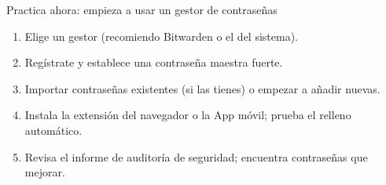 \begin{tcbpractice}{Practica ahora: empieza a usar un gestor de contraseñas}
\begin{enumerate}
  \item Elige un gestor (recomiendo Bitwarden o el del sistema).
  \item Regístrate y establece una contraseña maestra fuerte.
  \item Importar contraseñas existentes (si las tienes) o empezar a añadir nuevas.
  \item Instala la extensión del navegador o la App móvil; prueba el relleno automático.
  \item Revisa el informe de auditoría de seguridad; encuentra contraseñas que mejorar.
\end{enumerate}

\end{tcbpractice}
